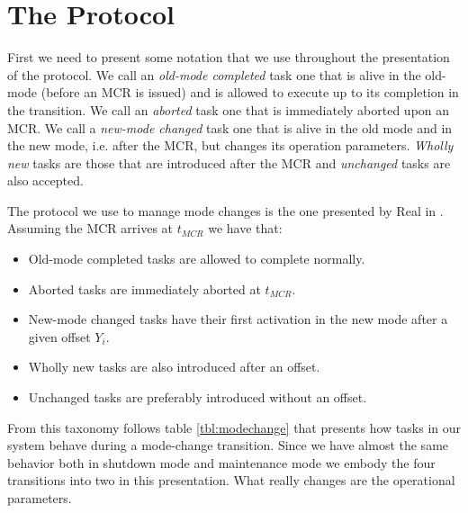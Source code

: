 \documentclass[10pt,a4paper]{report}
\begin{document}
\section{The Protocol}
First we need to present some notation that we use throughout the presentation
of the protocol. We call an \emph{old-mode completed} task one that is alive in 
the old-mode (before an MCR is issued) and is allowed to execute up to its 
completion in the transition. We call an \emph{aborted} task one that is 
immediately aborted upon an MCR. We call a \emph{new-mode changed} task one that 
is alive in the old mode and in the new mode, i.e. after the MCR, but changes its 
operation parameters. \emph{Wholly new} tasks are those that are introduced 
after the MCR and \emph{unchanged} tasks are also accepted. 

The protocol we use to manage mode changes is the one presented by Real in  
\cite{real04}. Assuming the MCR arrives at $t_{MCR}$ we have that:
\begin{itemize}
    \item Old-mode completed tasks are allowed to complete normally.
    \item Aborted tasks are immediately aborted at $t_{MCR}$.
    \item New-mode changed tasks have their first activation in the new mode 
          after a given offset $Y_i$. 
    \item Wholly new tasks are also introduced after an offset. 
    \item Unchanged tasks are preferably introduced without an offset. 
\end{itemize}
From this taxonomy follows table \ref{tbl:modechange} that presents how tasks 
in our system behave during a mode-change transition. Since we have almost the 
same behavior both in shutdown mode and maintenance mode we embody the four 
transitions into two in this presentation. What really changes  are the 
operational parameters. 
\end{document}
